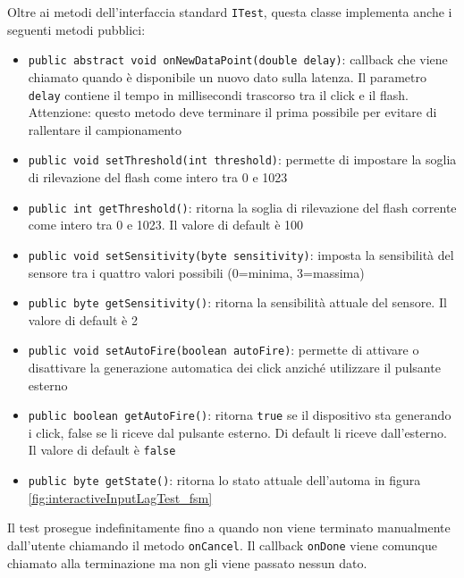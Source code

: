Oltre ai metodi dell'interfaccia standard \texttt{ITest}, questa classe implementa anche i seguenti metodi pubblici: \begin{itemize}
	\item \texttt{public abstract void onNewDataPoint(double delay)}: callback che viene chiamato quando è disponibile un nuovo dato sulla latenza. Il parametro \texttt{delay} contiene il tempo in millisecondi trascorso tra il click e il flash. Attenzione: questo metodo deve terminare il prima possibile per evitare di rallentare il campionamento
	\item \texttt{public void setThreshold(int threshold)}: permette di impostare la soglia di rilevazione del flash come intero tra 0 e 1023
	\item \texttt{public int getThreshold()}: ritorna la soglia di rilevazione del flash corrente come intero tra 0 e 1023. Il valore di default è 100
	\item \texttt{public void setSensitivity(byte sensitivity)}: imposta la sensibilità del sensore tra i quattro valori possibili (0=minima, 3=massima)
	\item \texttt{public byte getSensitivity()}: ritorna la sensibilità attuale del sensore. Il valore di default è 2
	\item \texttt{public void setAutoFire(boolean autoFire)}: permette di attivare o disattivare la generazione automatica dei click anziché utilizzare il pulsante esterno
	\item \texttt{public boolean getAutoFire()}: ritorna \texttt{true} se il dispositivo sta generando i click, false se li riceve dal pulsante esterno. Di default li riceve dall'esterno. Il valore di default è \texttt{false}
	\item \texttt{public byte getState()}: ritorna lo stato attuale dell'automa in figura \ref{fig:interactiveInputLagTest_fsm}
\end{itemize}

Il test prosegue indefinitamente fino a quando non viene terminato manualmente dall'utente chiamando il metodo \texttt{onCancel}. Il callback \texttt{onDone} viene comunque chiamato alla terminazione ma non gli viene passato nessun dato.

